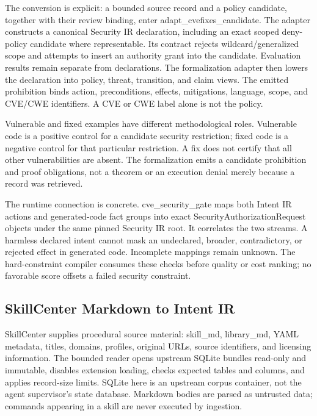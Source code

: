 \documentclass{article}
\begin{document}
The conversion is explicit: a bounded source record and a policy candidate, together with their review binding, enter adapt\_\allowbreak{}cvefixes\_\allowbreak{}candidate. The adapter constructs a canonical Security IR declaration, including an exact scoped deny-policy candidate where representable. Its contract rejects wildcard/generalized scope and attempts to insert an authority grant into the candidate. Evaluation results remain separate from declarations. The formalization adapter then lowers the declaration into policy, threat, transition, and claim views. The emitted prohibition binds action, preconditions, effects, mitigations, language, scope, and CVE/CWE identifiers. A CVE or CWE label alone is not the policy.

Vulnerable and fixed examples have different methodological roles. Vulnerable code is a positive control for a candidate security restriction; fixed code is a negative control for that particular restriction. A fix does not certify that all other vulnerabilities are absent. The formalization emits a candidate prohibition and proof obligations, not a theorem or an execution denial merely because a record was retrieved.

The runtime connection is concrete. cve\_\allowbreak{}security\_\allowbreak{}gate maps both Intent IR actions and generated-code fact groups into exact SecurityAuthorizationRequest objects under the same pinned Security IR root. It correlates the two streams. A harmless declared intent cannot mask an undeclared, broader, contradictory, or rejected effect in generated code. Incomplete mappings remain unknown. The hard-constraint compiler consumes these checks before quality or cost ranking; no favorable score offsets a failed security constraint.

\subsection{SkillCenter Markdown to Intent IR}

SkillCenter supplies procedural source material: skill\_\allowbreak{}md, library\_\allowbreak{}md, YAML metadata, titles, domains, profiles, original URLs, source identifiers, and licensing information. The bounded reader opens upstream SQLite bundles read-only and immutable, disables extension loading, checks expected tables and columns, and applies record-size limits. SQLite here is an upstream corpus container, not the agent supervisor's state database. Markdown bodies are parsed as untrusted data; commands appearing in a skill are never executed by ingestion.
\end{document}
